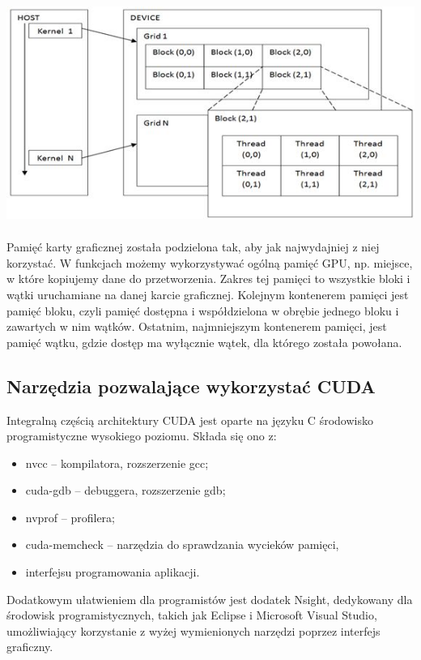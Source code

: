 \documentclass[12pt,a4paper]{article}
\begin{document}
\\\\\includegraphics[width=15cm,height=8cm]{img/cuda_arch.jpg}\\
\indent Pamięć karty graficznej została podzielona tak, aby jak najwydajniej z niej korzystać. W funkcjach możemy wykorzystywać ogólną pamięć GPU, np. miejsce, w które kopiujemy dane do przetworzenia. Zakres tej pamięci to wszystkie bloki i wątki uruchamiane na danej karcie graficznej. Kolejnym kontenerem pamięci jest pamięć bloku, czyli pamięć dostępna i współdzielona w obrębie jednego bloku i zawartych w nim wątków. Ostatnim, najmniejszym kontenerem pamięci, jest pamięć wątku, gdzie dostęp ma wyłącznie wątek, dla którego została powołana.
\subsection{Narzędzia pozwalające wykorzystać CUDA}
\indent Integralną częścią architektury CUDA jest oparte na języku C środowisko programistyczne wysokiego poziomu. Składa się ono z: \begin{itemize}
\item nvcc – kompilatora, rozszerzenie gcc;
\item cuda-gdb – debuggera, rozszerzenie gdb;
\item nvprof – profilera;
\item cuda-memcheck – narzędzia do sprawdzania wycieków pamięci,
\item interfejsu programowania aplikacji.
\end{itemize}
Dodatkowym ułatwieniem dla programistów jest dodatek Nsight, dedykowany dla środowisk programistycznych, takich jak Eclipse i Microsoft Visual Studio, umożliwiający korzystanie z wyżej wymienionych narzędzi poprzez interfejs graficzny.
\end{document}

